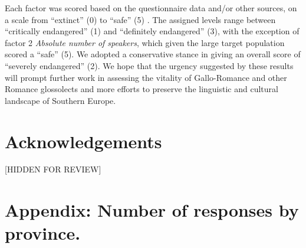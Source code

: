 \documentclass[a4paper,11pt]{article}
\begin{document}
Each factor was scored based on the questionnaire data and/or other sources, on a scale from ``extinct'' (0) to ``safe'' (5) \citet{unesco2003}. The assigned levels range between ``critically endangered'' (1) and ``definitely endangered'' (3), with the exception of factor 2 \textit{Absolute number of speakers}, which given the large target population scored a ``safe'' (5).
We adopted a conservative stance in giving an overall score of ``severely endangered'' (2). We hope that the urgency suggested by these results will prompt further work in assessing the vitality of Gallo-Romance and other Romance glossolects and more efforts to preserve the linguistic and cultural landscape of Southern Europe.

\section*{Acknowledgements}\label{sec:akn}

[HIDDEN FOR REVIEW]




\appendix
\section{Appendix: Number of responses by province.} \label{apx:provinces}
\end{document}
